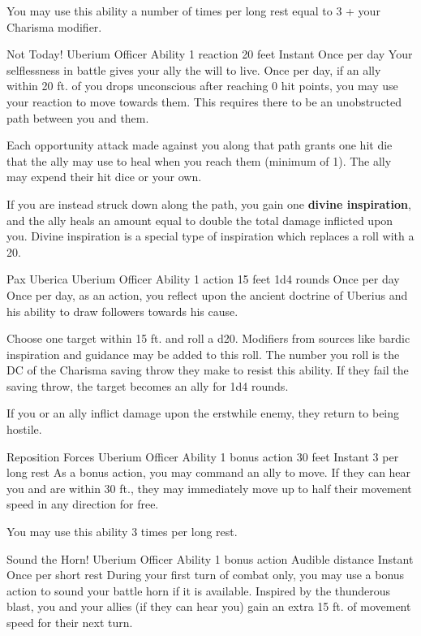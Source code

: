 You may use this ability a number of times per long rest
equal to 3 + your Charisma modifier.


\ability%
    {Not Today!}
    {Uberium Officer Ability}
    {1 reaction}
    {20 feet}
    {Instant}
    {Once per day}
Your selflessness in battle gives your ally the will to live.
Once per day, if an ally within 20 ft. of you drops unconscious
after reaching 0 hit points, you may use your reaction
to move towards them.
This requires there to be an unobstructed path between you and them.

Each opportunity attack made against you along that path
grants one hit die that the ally may use to heal
when you reach them (minimum of 1).
The ally may expend their hit dice or your own.

If you are instead struck down along the path,
you gain one \textbf{divine inspiration},
and the ally heals an amount equal to
double the total damage inflicted upon you.
Divine inspiration is a special type of inspiration
which replaces a roll with a 20.


\ability%
    {Pax Uberica}
    {Uberium Officer Ability}
    {1 action}
    {15 feet}
    {1d4 rounds}
    {Once per day}
Once per day, as an action,
you reflect upon the ancient doctrine of Uberius
and his ability to draw followers towards his cause.

Choose one target within 15 ft. and roll a d20.
Modifiers from sources like bardic inspiration and guidance
may be added to this roll.
The number you roll is the DC of the Charisma saving throw
they make to resist this ability.
If they fail the saving throw,
the target becomes an ally for 1d4 rounds.

If you or an ally inflict damage upon the erstwhile enemy,
they return to being hostile.


\ability%
    {Reposition Forces}
    {Uberium Officer Ability}
    {1 bonus action}
    {30 feet}
    {Instant}
    {3 per long rest}
As a bonus action, you may command an ally to move.
If they can hear you and are within 30 ft.,
they may immediately move up to half their movement speed
in any direction for free.

You may use this ability 3 times per long rest.


\ability%
    {Sound the Horn!}
    {Uberium Officer Ability}
    {1 bonus action}
    {Audible distance}
    {Instant}
    {Once per short rest}
During your first turn of combat only,
you may use a bonus action to sound your battle horn
if it is available.
Inspired by the thunderous blast,
you and your allies (if they can hear you)
gain an extra 15 ft. of movement speed
for their next turn.

